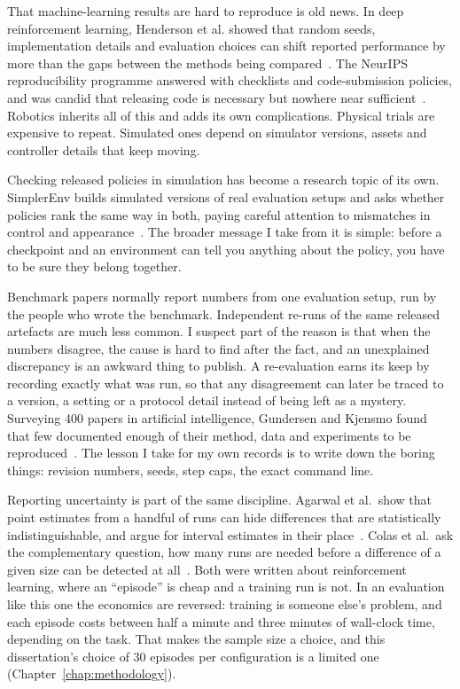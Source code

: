 That machine-learning results are hard to reproduce is old news. In deep reinforcement learning, Henderson et al. showed that random seeds, implementation details and evaluation choices can shift reported performance by more than the gaps between the methods being compared~\cite{henderson2018deep}. The NeurIPS reproducibility programme answered with checklists and code-submission policies, and was candid that releasing code is necessary but nowhere near sufficient~\cite{pineau2021improving}. Robotics inherits all of this and adds its own complications. Physical trials are expensive to repeat. Simulated ones depend on simulator versions, assets and controller details that keep moving.

Checking released policies in simulation has become a research topic of its own. SimplerEnv builds simulated versions of real evaluation setups and asks whether policies rank the same way in both, paying careful attention to mismatches in control and appearance~\cite{li2024simplerenv}. The broader message I take from it is simple: before a checkpoint and an environment can tell you anything about the policy, you have to be sure they belong together.

Benchmark papers normally report numbers from one evaluation setup, run by the people who wrote the benchmark. Independent re-runs of the same released artefacts are much less common. I suspect part of the reason is that when the numbers disagree, the cause is hard to find after the fact, and an unexplained discrepancy is an awkward thing to publish. A re-evaluation earns its keep by recording exactly what was run, so that any disagreement can later be traced to a version, a setting or a protocol detail instead of being left as a mystery. Surveying 400 papers in artificial intelligence, Gundersen and Kjensmo found that few documented enough of their method, data and experiments to be reproduced~\cite{gundersen2018state}. The lesson I take for my own records is to write down the boring things: revision numbers, seeds, step caps, the exact command line.

Reporting uncertainty is part of the same discipline. Agarwal et al.\ show that point estimates from a handful of runs can hide differences that are statistically indistinguishable, and argue for interval estimates in their place~\cite{agarwal2021precipice}. Colas et al.\ ask the complementary question, how many runs are needed before a difference of a given size can be detected at all~\cite{colas2018seeds}. Both were written about reinforcement learning, where an ``episode'' is cheap and a training run is not. In an evaluation like this one the economics are reversed: training is someone else's problem, and each episode costs between half a minute and three minutes of wall-clock time, depending on the task. That makes the sample size a choice, and this dissertation's choice of 30 episodes per configuration is a limited one (Chapter~\ref{chap:methodology}).

